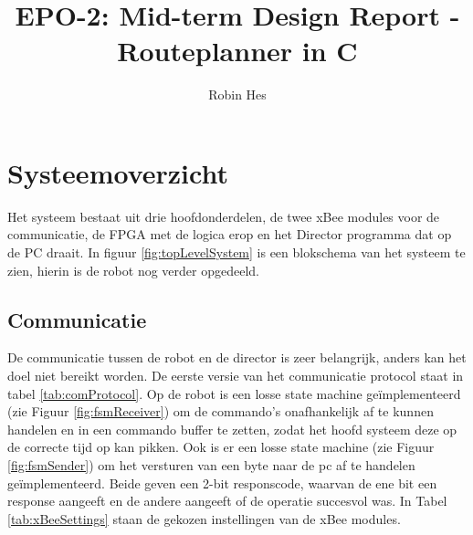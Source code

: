 \documentclass{report}
\title{EPO-2: Mid-term Design Report - Routeplanner in C}
\author{Robin Hes}
\begin{document}
\chapter{Systeemoverzicht}
\label{ch:systeem}
Het systeem bestaat uit drie hoofdonderdelen, de twee xBee modules voor de communicatie, de FPGA met de logica erop en het Director programma dat op de PC draait.
In figuur \ref{fig:topLevelSystem} is een blokschema van het systeem te zien, hierin is de robot nog verder opgedeeld. 
\section{Communicatie}
De communicatie tussen de robot en de director is zeer belangrijk, anders kan het doel niet bereikt worden.
De eerste versie van het communicatie protocol staat in tabel \ref{tab:comProtocol}.
Op de robot is een losse state machine geïmplementeerd (zie Figuur \ref{fig:fsmReceiver}) om de commando's onafhankelijk af te kunnen handelen en in een commando buffer te zetten, zodat het hoofd systeem deze op de correcte tijd op kan pikken.
Ook is er een losse state machine (zie Figuur \ref{fig:fsmSender}) om het versturen van een byte naar de pc af te handelen geïmplementeerd.
Beide geven een 2-bit responscode, waarvan de ene bit een response aangeeft en de andere aangeeft of de operatie succesvol was.
In Tabel \ref{tab:xBeeSettings} staan de gekozen instellingen van de xBee modules.
\end{document}
